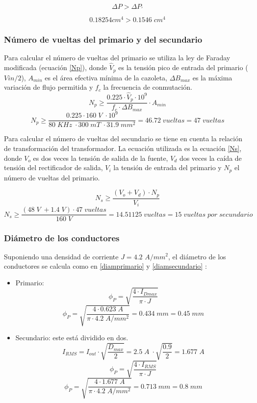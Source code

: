 \documentclass[11pt, a4paper]{article}
\begin{document}
\begin{equation}
\Delta P > \Delta P_{'}
\label{AP'}
\end{equation}

\[ 0.18254 cm^4 > 0.1546 \; cm^4 \]

\subsubsection{Número de vueltas del primario y del secundario}
Para calcular el número de vueltas del primario se utiliza la ley de Faraday modificada (ecuación \ref{Np}), donde $\hat{V}_p$ es la tensión pico de entrada del primario ($Vin/2$), $A_{min}$ es el área efectiva mínima de la cazoleta, $\Delta B_{max}$ es la máxima variación de flujo permitida y $f_c$ la frecuencia de conmutación.
\begin{equation}
	N_p \geq \frac{0.225 \cdot \hat{V}_p \cdot 10^9}{f_c \cdot \Delta B_{max}} \cdot A_{min} 
	\label{Np}
\end{equation}
\[ N_p \geq \frac{0.225 \cdot 160 \; V \; \cdot 10^9}{80 \; KHz \; \cdot 300 \; mT \; \cdot 31.9 \; mm^2} = 46.72 \; vueltas = 47 \; vueltas \]

Para calcular el número de vueltas del secundario se tiene en cuenta la relación de transformación del transformador. La ecuación utilizada es la ecuación \ref{Ns}, donde $V_o$ es dos veces la tensión de salida de la fuente, $V_d$ dos veces la caída de tensión del rectificador de salida, $V_i$ la tensión de entrada del primario y $N_p$ el número de vueltas del primario.

\begin{equation}
	N_s \geq \frac{(V_o + V_d) \cdot N_p}{V_i}
	\label{Ns}
\end{equation}
\[ N_s \geq \frac{(48 \; V \; + 1.4 \; V) \cdot 47 \; vueltas}{160 \; V} = 14.51125 \; vueltas = 15 \; vueltas \; por \; secundario \]

\subsubsection{Diámetro de los conductores}
Suponiendo una densidad de corriente $J = 4.2$ $A/mm^2$, el diámetro de los conductores se calcula como en \ref{diamprimario} y \ref{diamsecundario} :
\begin{itemize}
	\item Primario:
		\begin{equation}
		\phi_P = \sqrt{\frac{4 \cdot I_{Dmax}}{\pi \cdot J}}
		\label{diamprimario}
		\end{equation}
		\[ \phi_P = \sqrt{\frac{4 \cdot 0.623 \; A}{\pi \cdot 4.2 \; A/mm^2}} = 0.434 \; mm = 0.45 \; mm \]
	\item Secundario: este está dividido en dos.
		\[ I_{RMS} = I_{out} \cdot \sqrt{\frac{D_{max}}{2}} = 2.5 \; A \; \cdot \sqrt{\frac{0.9}{2}} = 1.677 \; A \]
		\begin{equation}
		\phi_P = \sqrt{\frac{4 \cdot I_{RMS}}{\pi \cdot J}}
		\label{diamsecundario}
		\end{equation}
		\[ \phi_P = \sqrt{\frac{4 \cdot 1.677 \; A}{\pi \cdot 4.2 \; A/mm^2}} = 0.713 \; mm = 0.8 \; mm \]
\end{itemize}
\end{document}
